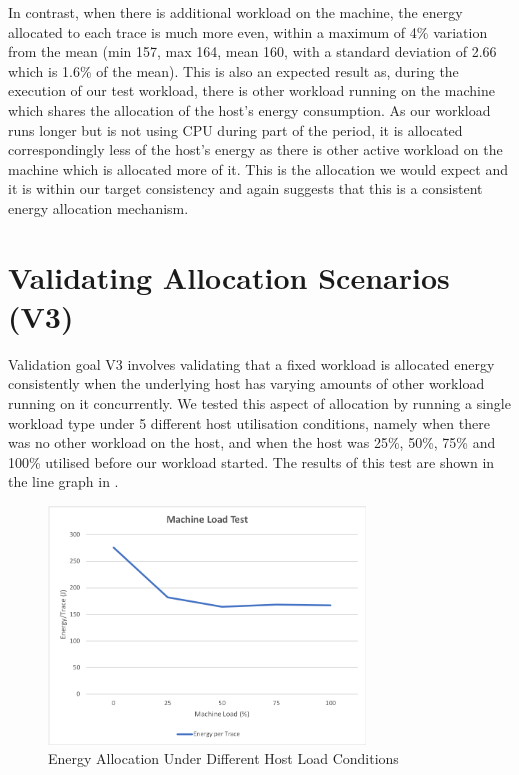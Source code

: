 In contrast, when there is additional workload on the machine, the energy allocated to each trace is much more even, within a maximum of 4\% variation from the mean (min 157, max 164, mean 160, with a standard deviation of 2.66 which is 1.6\% of the mean).  This is also an expected result as, during the execution of our test workload, there is other workload running on the machine which shares the allocation of the host's energy consumption.  As our workload runs longer but is not using CPU during part of the period, it is allocated correspondingly less of the host's energy as there is other active workload on the machine which is allocated more of it.  This is the allocation we would expect and it is within our target consistency and again suggests that this is a consistent energy allocation mechanism.

\section{Validating Allocation Scenarios (V3)}
\label{section:validatingallocation}

Validation goal V3 involves validating that a fixed workload is allocated energy consistently when the underlying host has varying amounts of other workload running on it concurrently.  We tested this aspect of allocation by running a single workload type under 5 different host utilisation conditions, namely when there was no other workload on the host, and when the host was 25\%, 50\%, 75\% and 100\% utilised before our workload started.  The results of this test are shown in the line graph in .

\begin{figure}
\centering
\includegraphics[width=0.75\textwidth,trim={2 2 2 2},clip]{Figures/validation-machineload}
\caption{Energy Allocation Under Different Host Load Conditions}
\label{figure:validation-machineload}
\end{figure}

